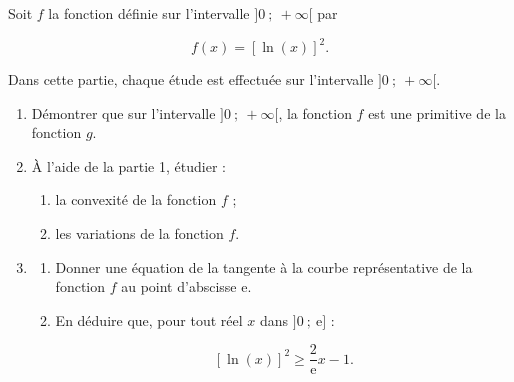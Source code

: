 Soit $f$ la fonction définie sur l'intervalle $]0~;~+ \infty[$ par

\[f(x) = [\ln (x)]^2.\]

 Dans cette partie, chaque étude est effectuée sur l'intervalle $]0~;~+ \infty[$.

\medskip

\begin{enumerate}
\item Démontrer que sur l'intervalle $]0~;~+ \infty[$, la fonction $f$ est une primitive de la fonction $g$.
\item À l'aide de la partie 1, étudier :
	\begin{enumerate}
		\item la convexité de la fonction $f$ ;
		\item les variations de la fonction $f$.
\end{enumerate}
\item 
	\begin{enumerate}
		\item Donner une équation de la tangente à la courbe représentative de la fonction $f$ au point d'abscisse e.
		\item En déduire que, pour tout réel $x$ dans $]0~;~\text{e}]$ :
		
\[[\ln (x)]^2 \geqslant \dfrac{2}{\text{e}}x - 1.\]

	\end{enumerate}
\end{enumerate}
\bigskip

